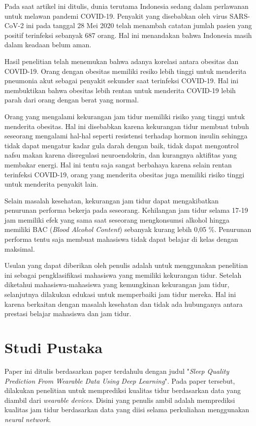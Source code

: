 \documentclass[12pt, a4paper]{article}
\begin{document}
\begin{multicols}{2}
Pada saat artikel ini ditulis, dunia terutama Indonesia sedang dalam perlawanan untuk melawan pandemi COVID-19. Penyakit yang disebabkan oleh virus SARS-CoV-2 ini pada tanggal 28 Mei 2020 telah menambah catatan jumlah pasien yang positif terinfeksi sebanyak 687 orang. Hal ini menandakan bahwa Indonesia masih dalam keadaan belum aman. \cite{Putri.2020} 

Hasil penelitian telah menemukan bahwa adanya korelasi antara obesitas dan COVID-19. Orang dengan obesitas memiliki resiko lebih tinggi untuk menderita pneumonia akut sebagai penyakit sekunder saat terinfeksi COVID-19. Hal ini membuktikan bahwa obesitas lebih rentan untuk menderita COVID-19 lebih parah dari orang dengan berat yang normal. \cite{Cai.2020}

Orang yang mengalami kekurangan jam tidur memiliki risiko yang tinggi untuk menderita obesitas. Hal ini disebabkan karena kekurangan tidur membuat tubuh seseorang mengalami hal-hal seperti resistensi terhadap hormon insulin sehingga tidak dapat mengatur kadar gula darah dengan baik, tidak dapat mengontrol nafsu makan karena disregulasi neuroendokrin, dan kurangnya aktifitas yang membakar energi. Hal ini tentu saja sangat berbahaya karena selain rentan terinfeksi COVID-19, orang
yang menderita obesitas juga memiliki risiko tinggi untuk menderita penyakit lain. \cite{Knutson.2007}

Selain masalah kesehatan, kekurangan jam tidur dapat mengakibatkan penurunan performa bekerja pada seseorang. Kehilangan jam tidur selama 17-19 jam memiliki efek yang sama saat seseorang mengkonsumsi alkohol hingga memiliki BAC (\textit{Blood Alcohol Content}) sebanyak kurang lebih 0,05 \%. Penurunan performa tentu saja membuat mahasiswa tidak dapat belajar di kelas dengan maksimal. \cite{Williamson.2000}

Usulan yang dapat diberikan oleh penulis adalah untuk menggunakan penelitian ini sebagai pengklasifikasi mahasiswa yang memiliki kekurangan tidur. Setelah diketahui mahasiswa-mahasiswa yang kemungkinan kekurangan jam tidur, selanjutnya dilakukan edukasi untuk memperbaiki jam tidur mereka. Hal ini karena berkaitan dengan masalah kesehatan dan tidak ada hubunganya antara prestasi belajar mahasiswa dan jam tidur. \cite{Sarfriyanda.2015}

\section{Studi Pustaka}
Paper ini ditulis berdasarkan paper terdahulu dengan judul "\textit{Sleep Quality Prediction From Wearable Data Using Deep Learning}". Pada paper tersebut, dilakukan penelitian untuk memprediksi kualitas tidur berdasarkan data yang diambil dari \textit{wearable devices}. Disini yang penulis ambil adalah memprediksi kualitas jam tidur berdasarkan data yang diisi selama perkuliahan menggunakan \textit{neural network}. \cite{Sathyanarayana.2016}


\end{multicols}
\end{document}
